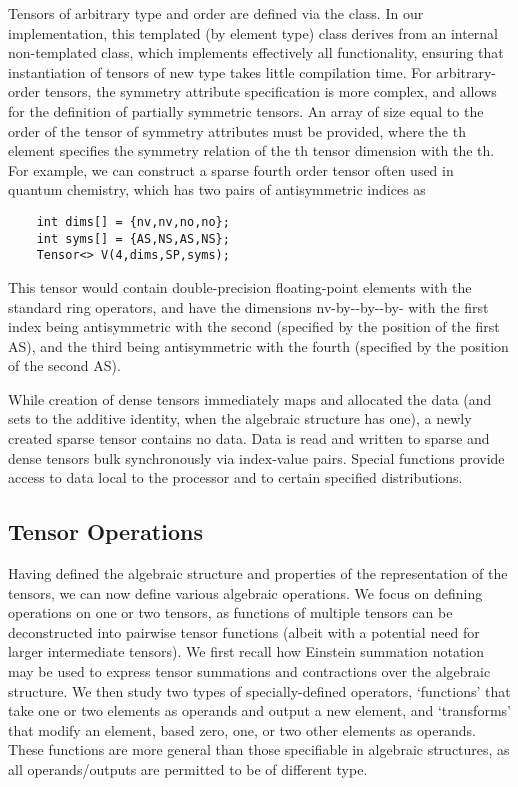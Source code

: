 Tensors of arbitrary type and order are defined via the {} class.
In our implementation, this templated (by element type) class derives from an internal non-templated class, which implements effectively all functionality, ensuring that instantiation of tensors of new type takes little compilation time.
For arbitrary-order tensors, the symmetry attribute specification is more complex, and allows for the definition of partially symmetric tensors.
An array of size equal to the order of the tensor of symmetry attributes must be provided, where the th element specifies the symmetry relation of the th tensor dimension with the th.
For example, we can construct a sparse fourth order tensor often used in quantum chemistry, which has two pairs of antisymmetric indices as
\begin{lstlisting}
    int dims[] = {nv,nv,no,no};
    int syms[] = {AS,NS,AS,NS};
    Tensor<> V(4,dims,SP,syms);
\end{lstlisting}
This tensor would contain double-precision floating-point elements with the standard ring operators, and have the dimensions {\CD nv}-by-{}-by-{}-by-{} with the first index being antisymmetric with the second (specified by the position of the first AS), and the third being antisymmetric with the fourth (specified by the position of the second AS).

While creation of dense tensors immediately maps and allocated the data (and sets to the additive identity, when the algebraic structure has one), a newly created sparse tensor contains no data.
Data is read and written to sparse and dense tensors bulk synchronously via index-value pairs.
Special functions provide access to data local to the processor and to certain specified distributions.

\subsection{Tensor Operations}

Having defined the algebraic structure and properties of the representation of the tensors, we can now define various algebraic operations.
We focus on defining operations on one or two tensors, as functions of multiple tensors can be deconstructed into pairwise tensor functions (albeit with a potential need for larger intermediate tensors).
We first recall how Einstein summation notation may be used to express tensor summations and contractions over the algebraic structure.
We then study two types of specially-defined operators, `functions' that take one or two elements as operands and output a new element, and `transforms' that modify an element, based zero, one, or two other elements as operands.
These functions are more general than those specifiable in algebraic structures, as all operands/outputs are permitted to be of different type.

